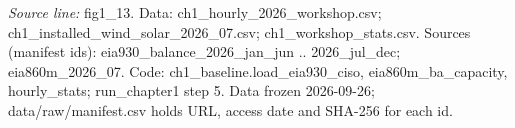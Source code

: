{\scriptsize\textit{Source line:} fig1\_\allowbreak{}13. Data: ch1\_\allowbreak{}hourly\_\allowbreak{}2026\_\allowbreak{}workshop.csv; ch1\_\allowbreak{}installed\_\allowbreak{}wind\_\allowbreak{}solar\_\allowbreak{}2026\_\allowbreak{}07.csv; ch1\_\allowbreak{}workshop\_\allowbreak{}stats.csv. Sources (manifest ids): eia930\_\allowbreak{}balance\_\allowbreak{}2026\_\allowbreak{}jan\_\allowbreak{}jun .. 2026\_\allowbreak{}jul\_\allowbreak{}dec; eia860m\_\allowbreak{}2026\_\allowbreak{}07. Code: ch1\_\allowbreak{}baseline.load\_\allowbreak{}eia930\_\allowbreak{}ciso, eia860m\_\allowbreak{}ba\_\allowbreak{}capacity, hourly\_\allowbreak{}stats; run\_\allowbreak{}chapter1 step 5. Data frozen 2026-09-26; data/raw/manifest.csv holds URL, access date and SHA-256 for each id.}